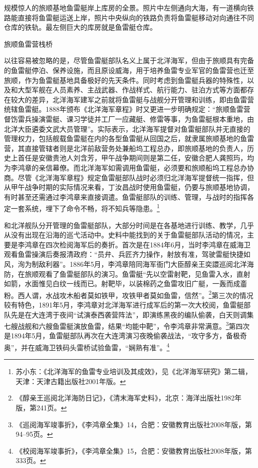 \documentclass[12pt,UTF8]{ctexbook}
\begin{document}
规模惊人的旅顺基地鱼雷艇岸上库房的全景。照片中左侧通向大海，有一道横向铁路能直接将鱼雷艇运送上岸，照片中央纵向的铁路负责将鱼雷艇移动对向通往不同仓库的铁轨。最左侧巨大的库房就是鱼雷艇仓库。

旅顺鱼雷营栈桥

以往容易被忽略的是，尽管鱼雷艇部队名义上属于北洋海军，但由于旅顺具有完备的鱼雷艇停泊、保养设施，而且原设威海，用于培养鱼雷专业军官的鱼雷营也迁至旅顺，作为鱼雷艇基地具备极好的先天条件。同时考虑到鱼雷艇兵器的特殊性，以及和大型军舰在人员素养、主战武器、作战样式、航行能力、驻泊方式等方面都存在较大的差异，北洋海军建军之前就将鱼雷艇与战舰分开管理和训练，即由鱼雷营统辖鱼雷艇。1888年颁布《北洋海军章程》时又更进一步明确规定：“旅顺鱼雷营督饬雷兵操演雷艇、课习学徒并工厂一应藏艇、修雷等事，为鱼雷艇根本重地，由北洋大臣遴委文武大员管理”。实际表示，北洋海军提督对鱼雷艇部队并无直接的管理权力，包括舰载鱼雷艇在内的各型鱼雷艇从回国之后，就隶属旅顺基地的鱼雷营，其直接管辖者则是北洋前敌营务处兼船坞工程总办，即旅顺基地的负责人，历史上首任是安徽贵池人刘含芳，甲午战争期间则是第二任，安徽合肥人龚照玙，均为李鸿章的亲信幕僚。而北洋海军如需调用鱼雷艇，必须要和旅顺船坞工程总办协商。尽管《北洋海军章程》规定鱼雷艇部队战时必须归北洋海军提督统一指挥，但从甲午战争时期的实际情况来看，丁汝昌战时使用鱼雷艇，仍要与旅顺基地协调，有时甚至还需通过李鸿章来直接调遣。鱼雷艇部队的训练、管理，与战时的指挥各定一套系统，埋下了命令不畅，将不知兵等隐患。\footnote{苏小东：《北洋海军的鱼雷专业培训及其成效》，见《北洋海军研究》第二辑，天津：天津古籍出版社2001年版。}

和北洋舰队分开管理的鱼雷艇部队，大部分时间是在各基地进行训练、教学，几乎从没有出现在沿海的巡弋活动中。史料中能找到的关于鱼雷艇部队活动的情况，主要是李鸿章在四次检阅海军后的奏折。首次是在1884年6月，当时李鸿章在威海卫观看鱼雷操演后奏报清政府：“员弁、兵匠齐力操作，射放有准，驾驶雷艇快捷如风，洵为制敌利器”。1886年5月，李鸿章陪同海军衙门大臣醇亲王奕譞巡阅北洋海防，在旅顺观看了鱼雷艇部队的演习。鱼雷艇“先以空雷射靶，见鱼雷入水，直射如箭，水面惟见白纹一线而已。射靶毕，以装棉药之鱼雷攻旧广艇，一轰而成齑粉。西人谓，水战攻木船者莫如铁甲，攻铁甲者莫如鱼雷，信然”。\footnote{《醇亲王巡阅北洋海防日记》，《清末海军史料》，北京：海洋出版社1982年版，第241页。}第三次的情况较有特色，1891年5月，李鸿章对北洋海军进行成军后的第一次大校阅，鱼雷艇部队先是在大连湾于夜间“试演泰西袭营阵法”，即演练黑夜的编队偷袭，白天则调集七艘战舰和六艘鱼雷艇演放鱼雷，结果“均能中靶”，令李鸿章非常满意。\footnote{《巡阅海军竣事折》，《李鸿章全集》14，合肥：安徽教育出版社2008年版，第94--95页。}第四次是1894年5月，鱼雷艇部队再次在大连湾演习夜晚偷袭战法，“攻守多方，备极奇奥”，并在威海卫铁码头雷桥试验鱼雷，“娴熟有准”。\footnote{《校阅海军竣事折》，《李鸿章全集》15，合肥：安徽教育出版社2008年版，第333页。}
\end{document}
